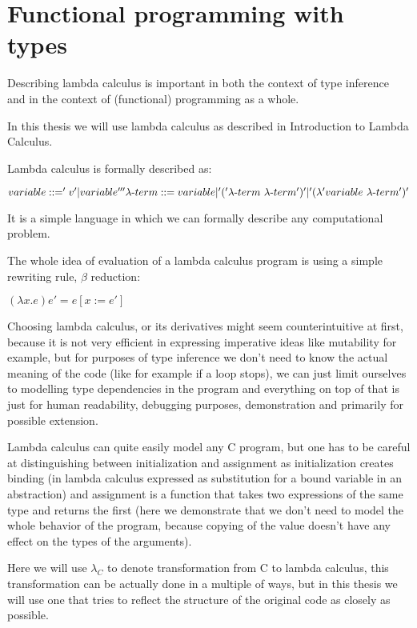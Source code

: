 \chapter{Functional programming with types}

Describing lambda calculus is important in both the context of type inference and in the context of (functional)
programming as a whole.

In this thesis we will use lambda calculus as described in Introduction to Lambda Calculus.  %

Lambda calculus is formally described as:

$variable ::= 'v' | variable ''' \\ \lambda\mbox{-}term ::= variable | '(' \lambda\mbox{-}term\ \lambda\mbox{-}term ')' |  '(\lambda' variable\ \lambda\mbox{-}term ')'$

It is a simple language in which we can formally describe any computational problem.

The whole idea of evaluation of a lambda calculus program is using a simple rewriting rule, $\beta$ reduction:

$(\lambda x . e) e' = e [x := e']$ %

Choosing lambda calculus, or its derivatives might seem counterintuitive at first, because it
is not very efficient in expressing imperative ideas like mutability for example, but for
purposes of type inference we don't need to know the actual meaning of the code (like for example
if a loop stops), we can just limit ourselves to modelling type dependencies in the program and
everything on top of that is just for human readability, debugging purposes, demonstration and
primarily for possible extension.

Lambda calculus can quite easily model any C program, but one has to be careful at distinguishing
between initialization and assignment as initialization creates binding (in lambda calculus expressed
as substitution for a bound variable in an abstraction) and assignment is a function that takes two
expressions of the same type and returns the first (here we demonstrate that we don't need to
model the whole behavior of the program, because copying of the value doesn't have any effect on
the types of the arguments).

Here we will use $\lambda_C$ to denote transformation from C to lambda calculus,
this transformation can be actually done in a multiple of ways, but in this thesis we will use one that tries to
reflect the structure of the original code as closely as possible.

